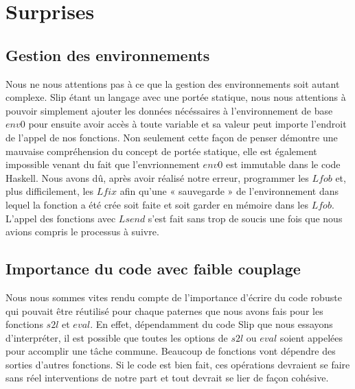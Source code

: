 \documentclass{article}
\begin{document}
	\section{Surprises}
	\subsection{Gestion des environnements}
	Nous ne nous attentions pas à ce que la gestion des environnements soit autant
	complexe. Slip étant un langage avec une portée statique, nous nous attentions
	à pouvoir simplement ajouter les données nécéssaires à l'environnement de base
	$env0$ pour ensuite avoir accès à toute variable et sa valeur peut importe l'endroit
	de l'appel de nos fonctions. Non seulement cette façon de penser démontre une mauvaise
	compréhension du concept de portée statique, elle est également impossible
	venant du fait que l'envrionnement $env0$ est immutable dans le code Haskell. Nous
	avons dû, après avoir réalisé notre erreur, programmer les $Lfob$ et, plus
	difficilement, les $Lfix$ afin qu'une « sauvegarde » de l'environnement dans lequel
	la fonction a été crée soit faite et soit garder en mémoire dans les $Lfob$. L'appel
	des fonctions avec $Lsend$ s'est fait sans trop de soucis une fois que nous
	avions compris le processus à suivre.

	\subsection{Importance du code avec faible couplage}
	Nous nous sommes vites rendu compte de l'importance d'écrire du code robuste
	qui pouvait être réutilisé pour chaque paternes que nous avons fais pour les
	fonctions $s2l$ et $eval$. En effet, dépendamment du code Slip que nous
	essayons d'interpréter, il est possible que toutes les options de $s2l$ ou $eva
	l$ soient appelées pour accomplir une tâche commune. Beaucoup de fonctions
	vont dépendre des sorties d'autres fonctions. Si le code est bien fait, ces
	opérations devraient se faire sans réel interventions de notre part et tout
	devrait se lier de façon cohésive.
\end{document}
